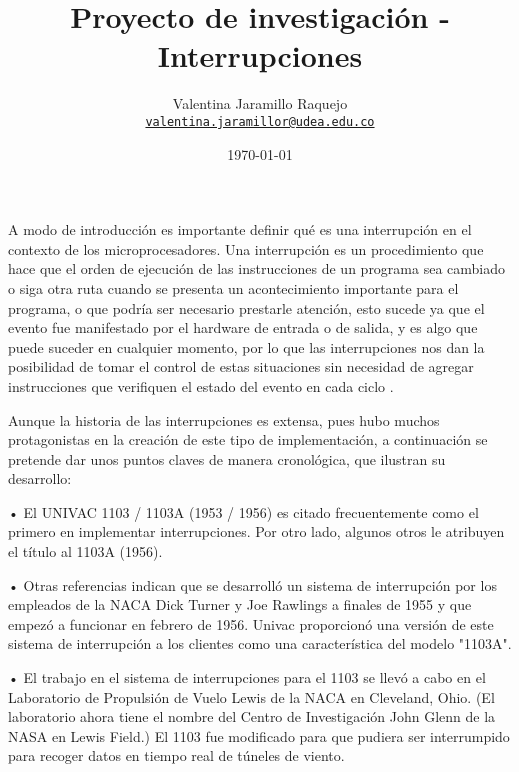 \documentclass[12pt]{article}
\title{Proyecto de investigación - Interrupciones
}
\author{Valentina Jaramillo Raquejo\\%
    \href{mailto:valentina.jaramillor@udea.edu.co}{\texttt{valentina.jaramillor@udea.edu.co}} %
    }
\date{\today}
\begin{document}
{
\maketitle


A modo de introducción es importante definir qué es una interrupción en el contexto de los microprocesadores. Una interrupción es un procedimiento que hace que el orden de ejecución de las instrucciones de un programa sea cambiado o siga otra ruta cuando se presenta un acontecimiento importante para el programa, o que podría ser necesario prestarle atención, esto sucede ya que el evento fue manifestado por el hardware de entrada o de salida, y es algo que puede suceder en cualquier momento, por lo que las interrupciones nos dan la posibilidad de tomar el control de estas situaciones sin necesidad de agregar instrucciones que verifiquen el estado del evento en cada ciclo \citep{Defini}.
\newline

Aunque la historia de las interrupciones es extensa, pues hubo muchos protagonistas en la creación de este tipo de implementación, a continuación se pretende dar unos puntos claves de manera cronológica, que ilustran su desarrollo:
\newline

•	El UNIVAC 1103 / 1103A (1953 / 1956) es citado frecuentemente como el primero en implementar interrupciones. Por otro lado, algunos otros le atribuyen el título al 1103A (1956).

•	Otras referencias indican que se desarrolló un sistema de interrupción por los empleados de la NACA Dick Turner y Joe Rawlings a finales de 1955 y que empezó a funcionar en febrero de 1956. Univac proporcionó una versión de este sistema de interrupción a los clientes como una característica del modelo "1103A".

•	El trabajo en el sistema de interrupciones para el 1103 se llevó a cabo en el Laboratorio de Propulsión de Vuelo Lewis de la NACA en Cleveland, Ohio. (El laboratorio ahora tiene el nombre del Centro de Investigación John Glenn de la NASA en Lewis Field.) El 1103 fue modificado para que pudiera ser interrumpido para recoger datos en tiempo real de túneles de viento.

}
\end{document}
